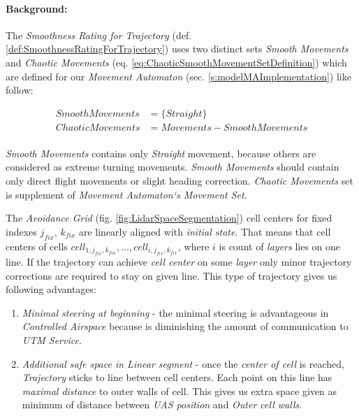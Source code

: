 \paragraph{Background:} The \emph{Smoothness Rating for Trajectory} (def. \ref{def:SmoothnessRatingForTrajectory}) uses two distinct sets \emph{Smooth Movements} and \emph{Chaotic Movements} (eq. \ref{eq:ChaoticSmoothMovementSetDefinition}) which are defined for our \emph{Movement Automaton}  (sec. \ref{s:modelMAImplementation}) like follow:

\begin{equation}
    \begin{aligned}
    Smooth Movements &= \{Straight\} \\
    Chaotic Movements &= Movements - Smooth Movements\\
    \end{aligned}
\end{equation}

\emph{Smooth Movements} contains only \emph{Straight} movement, because others are considered as extreme turning movements. \emph{Smooth Movements} should contain only direct flight movements or slight heading correction. \emph{Chaotic Movements} set is supplement of \emph{Movement Automaton`s Movement Set}. 

The \emph{Avoidance Grid} (fig. \ref{fig:LidarSpaceSegmentation}) cell centers for fixed indexes $j_{fix}$, $k_{fix}$ are linearly aligned with \emph{initial state}. That means that  cell centers of cells $cell_{1,j_{fix},k_{fix}},\dots, cell_{i,j_{fix},k_{fix}}$, where $i$ is count of \emph{layers} lies on one line.  If the trajectory can achieve \emph{cell center} on some \emph{layer} only minor trajectory corrections are required to stay on given line. This type of trajectory gives us following advantages:
\begin{enumerate}
    \item\emph{Minimal steering at beginning} - the minimal steering is advantageous in \emph{Controlled Airspace} because is diminishing the amount of communication to \emph{UTM Service}.
    
    \item\emph{Additional safe space in Linear segment} - once the \emph{center of cell} is reached, \emph{Trajectory} sticks to line between cell centers. Each point on this line has \emph{maximal distance} to outer walls of cell. This gives us extra space given as minimum of distance between \emph{UAS position} and \emph{Outer cell walls}.
\end{enumerate}

